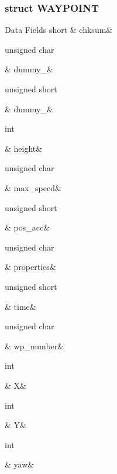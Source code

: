 \subsubsection{struct W\-A\-Y\-P\-O\-I\-N\-T}
\begin{DoxyFields}{Data Fields}
\hypertarget{a00004_a8191d25c9e9667de75b852aa1b3cd7b7}{short}\label{a00004_a8191d25c9e9667de75b852aa1b3cd7b7}
&
chksum&
\\
\hline

\hypertarget{a00004_a42e84e4d4c65fe419a617709cc917e94}{unsigned char}\label{a00004_a42e84e4d4c65fe419a617709cc917e94}
&
dummy\-\_&
\\
\hline

\hypertarget{a00004_ac19ac6c2b8775c374a37861835810517}{unsigned short}\label{a00004_ac19ac6c2b8775c374a37861835810517}
&
dummy\-\_&
\\
\hline

\hypertarget{a00004_ad12fc34ce789bce6c8a05d8a17138534}{int}\label{a00004_ad12fc34ce789bce6c8a05d8a17138534}
&
height&
\\
\hline

\hypertarget{a00004_a38184c087a13ec7e1b887656d9ccf848}{unsigned char}\label{a00004_a38184c087a13ec7e1b887656d9ccf848}
&
max\-\_\-speed&
\\
\hline

\hypertarget{a00004_a702e933b2034a3d94950c39bfdcd3052}{unsigned short}\label{a00004_a702e933b2034a3d94950c39bfdcd3052}
&
pos\-\_\-acc&
\\
\hline

\hypertarget{a00004_a78b61a2d452301b80cd56942bfc362e0}{unsigned char}\label{a00004_a78b61a2d452301b80cd56942bfc362e0}
&
properties&
\\
\hline

\hypertarget{a00004_a9e291d833ba33b59d6063a0cd586a86b}{unsigned short}\label{a00004_a9e291d833ba33b59d6063a0cd586a86b}
&
time&
\\
\hline

\hypertarget{a00004_a66219f3f331762fb4a8d21c1f01d1105}{unsigned char}\label{a00004_a66219f3f331762fb4a8d21c1f01d1105}
&
wp\-\_\-number&
\\
\hline

\hypertarget{a00004_a80c0944640e62d3ed6c5419c1bcc0c88}{int}\label{a00004_a80c0944640e62d3ed6c5419c1bcc0c88}
&
X&
\\
\hline

\hypertarget{a00004_aa482c4cc86a24474e4fb19b5b5978778}{int}\label{a00004_aa482c4cc86a24474e4fb19b5b5978778}
&
Y&
\\
\hline

\hypertarget{a00004_a7d2cd970242d8b46e019dd7653588b30}{int}\label{a00004_a7d2cd970242d8b46e019dd7653588b30}
&
yaw&
\\
\hline

\end{DoxyFields}
